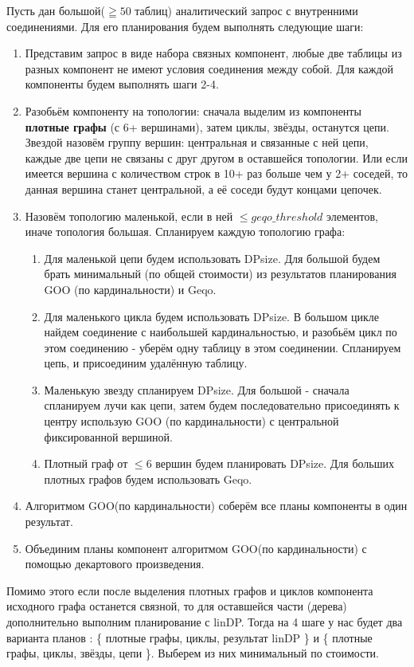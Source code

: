 \documentclass[12pt]{article}
\begin{document}
\begin{flushleft}
Пусть дан большой($\geqq 50$ таблиц) аналитический запрос с внутренними соединениями. Для его планирования будем выполнять 
следующие шаги:
\begin{enumerate}
    \item Представим запрос в виде набора связных компонент, любые две таблицы из разных компонент не имеют условия соединения между собой. 
Для каждой компоненты будем выполнять шаги 2-4.
    \item Разобьём компоненту на топологии: сначала выделим из компоненты \textbf{плотные графы} (с 6+ вершинами), затем циклы, звёзды, останутся цепи. 
Звездой назовём группу вершин: центральная и связанные с ней цепи, каждые две цепи не связаны с друг другом в оставшейся топологии. Или если имеется 
вершина с количеством строк в 10+ раз больше чем у 2+ соседей, то данная вершина станет центральной, а её соседи будут концами цепочек.
    \item Назовём топологию маленькой, если в ней $\leq geqo\_threshold$ элементов, иначе топология большая. Спланируем каждую топологию графа:\newline
    \begin{enumerate}
        \item Для маленькой цепи будем использовать DPsize. Для большой будем брать минимальный (по общей стоимости) из результатов планирования 
        GOO (по кардинальности) и Geqo.
        \item Для маленького цикла будем использовать DPsize. В большом цикле найдем соединение с наибольшей кардинальностью, и разобьём цикл 
        по этом соединению - уберём одну таблицу в этом соединении. Спланируем цепь, и присоединим удалённую таблицу.
        \item Маленькую звезду спланируем DPsize. Для большой - сначала спланируем лучи как цепи, затем будем последовательно присоединять к 
        центру использую GOO (по кардинальности) с центральной фиксированной вершиной.
        \item Плотный граф от $\leq 6$ вершин будем планировать DPsize. Для больших плотных графов будем использовать Geqo.
    \end{enumerate}
    \item Алгоритмом GOO(по кардинальности) соберём все планы компоненты в один результат.
    \item Объединим планы компонент алгоритмом GOO(по кардинальности) с помощью декартового произведения.
\end{enumerate}

Помимо этого если после выделения плотных графов и циклов компонента исходного графа останется связной, то для оставшейся части (дерева) дополнительно  выполним 
планирование с linDP. Тогда на 4 шаге у нас будет два варианта планов : \{ плотные графы, циклы, результат linDP \} и \{ плотные графы, циклы, звёзды, цепи \}. Выберем из 
них минимальный по стоимости.
\centering 

\raggedright

\end{flushleft}
\end{document}
